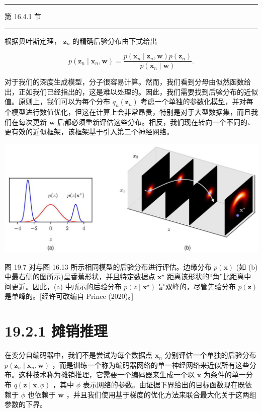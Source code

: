 \documentclass[10pt]{report}
\newcommand{\HRule}{\begin{center}\rule{0.9\linewidth}{0.2mm}\end{center}}
\begin{document}
\HRule

第 16.4.1 节

\HRule

根据贝叶斯定理， \({\mathbf{z}}_{n}\) 的精确后验分布由下式给出

\[
p\left( {{\mathbf{z}}_{n} \mid  {\mathbf{x}}_{n},\mathbf{w}}\right)  = \frac{p\left( {{\mathbf{x}}_{n} \mid  {\mathbf{z}}_{n},\mathbf{w}}\right) p\left( {\mathbf{z}}_{n}\right) }{p\left( {{\mathbf{x}}_{n} \mid  \mathbf{w}}\right) }. \tag{19.12}
\]

对于我们的深度生成模型，分子很容易计算。然而，我们看到分母由似然函数给出，正如我们已经指出的，这是难以处理的。因此，我们需要找到后验分布的近似值。原则上，我们可以为每个分布 \({q}_{n}\left( {\mathbf{z}}_{n}\right)\) 考虑一个单独的参数化模型，并对每个模型进行数值优化，但这在计算上会非常昂贵，特别是对于大型数据集，而且我们在每次更新 \(\mathbf{w}\) 后都必须重新评估这些分布。相反，我们现在转向一个不同的、更有效的近似框架，该框架基于引入第二个神经网络。

\begin{center}
\includegraphics[max width=1.0\textwidth]{images/0194e279-9b28-703a-88f4-c3ac21e2010d_591_234_366_1297_557_0.jpg}
\end{center}
\hspace*{3em} 

图 19.7 对与图 16.13 所示相同模型的后验分布进行评估。边缘分布 \(p\left( \mathbf{x}\right)\) (如 (b) 中最右侧的图所示)呈香蕉形状，并且特定数据点 \({\mathbf{x}}^{ \star  }\) 距离该形状的“角”比距离中间更近。因此，(a) 中所示的后验分布 \(p\left( {z \mid  {\mathbf{x}}^{ \star  }}\right)\) 是双峰的，尽管先验分布 \(p\left( \mathbf{z}\right)\) 是单峰的。[经许可改编自 Prince (2020)。]

\section*{19.2.1 摊销推理}

在变分自编码器中，我们不是尝试为每个数据点 \({\mathbf{x}}_{n}\) 分别评估一个单独的后验分布 \(p\left( {{\mathbf{z}}_{n} \mid  {\mathbf{x}}_{n},\mathbf{w}}\right)\) ，而是训练一个称为编码器网络的单一神经网络来近似所有这些分布。这种技术称为摊销推理，它需要一个编码器来生成一个以 \(\mathbf{x}\) 为条件的单一分布 \(q\left( {\mathbf{z} \mid  \mathbf{x},\phi }\right)\) ，其中 \(\phi\) 表示网络的参数。由证据下界给出的目标函数现在既依赖于 \(\phi\) 也依赖于 \(\mathbf{w}\) ，并且我们使用基于梯度的优化方法来联合最大化关于这两组参数的下界。
\end{document}
